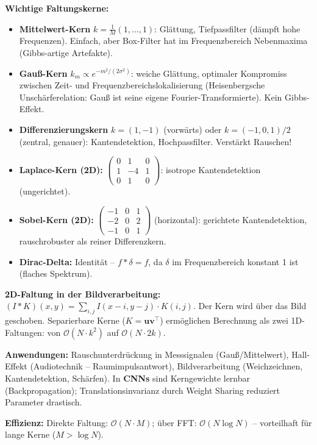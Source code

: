 \textbf{Wichtige Faltungskerne:}
\begin{itemize}[leftmargin=1.5em]
    \item \textbf{Mittelwert-Kern} $k=\frac{1}{M}(1,\ldots,1)$: Glättung, Tiefpassfilter (dämpft hohe Frequenzen). Einfach, aber Box-Filter hat im Frequenzbereich Nebenmaxima (Gibbs-artige Artefakte).
    \item \textbf{Gauß-Kern} $k_m \propto e^{-m^2/(2\sigma^2)}$: weiche Glättung, optimaler Kompromiss zwischen Zeit- und Frequenzbereichslokalisierung (Heisenbergsche Unschärferelation: Gauß ist seine eigene Fourier-Transformierte). Kein Gibbs-Effekt.
    \item \textbf{Differenzierungskern} $k=(1,-1)$ (vorwärts) oder $k=(-1,0,1)/2$ (zentral, genauer): Kantendetektion, Hochpassfilter. Verstärkt Rauschen!
    \item \textbf{Laplace-Kern (2D):} $\begin{pmatrix}0&1&0\\1&-4&1\\0&1&0\end{pmatrix}$: isotrope Kantendetektion (ungerichtet).
    \item \textbf{Sobel-Kern (2D):} $\begin{pmatrix}-1&0&1\\-2&0&2\\-1&0&1\end{pmatrix}$ (horizontal): gerichtete Kantendetektion, rauschrobuster als reiner Differenzkern.
    \item \textbf{Dirac-Delta:} Identität -- $f*\delta = f$, da $\delta$ im Frequenzbereich konstant 1 ist (flaches Spektrum).
\end{itemize}

\textbf{2D-Faltung in der Bildverarbeitung:} $(I * K)(x,y) = \sum_{i,j} I(x-i, y-j) \cdot K(i,j)$. Der Kern wird über das Bild geschoben. Separierbare Kerne ($K = \bm{u}\bm{v}^\top$) ermöglichen Berechnung als zwei 1D-Faltungen: von $\mathcal{O}(N \cdot k^2)$ auf $\mathcal{O}(N \cdot 2k)$.

\textbf{Anwendungen:} Rauschunterdrückung in Messsignalen (Gauß/Mittelwert), Hall-Effekt (Audiotechnik -- Raumimpulsantwort), Bildverarbeitung (Weichzeichnen, Kantendetektion, Schärfen). In \textbf{CNNs} sind Kerngewichte lernbar (Backpropagation); Translationsinvarianz durch Weight Sharing reduziert Parameter drastisch.

\textbf{Effizienz:} Direkte Faltung: $\mathcal{O}(N \cdot M)$; über FFT: $\mathcal{O}(N\log N)$ -- vorteilhaft für lange Kerne ($M > \log N$).

